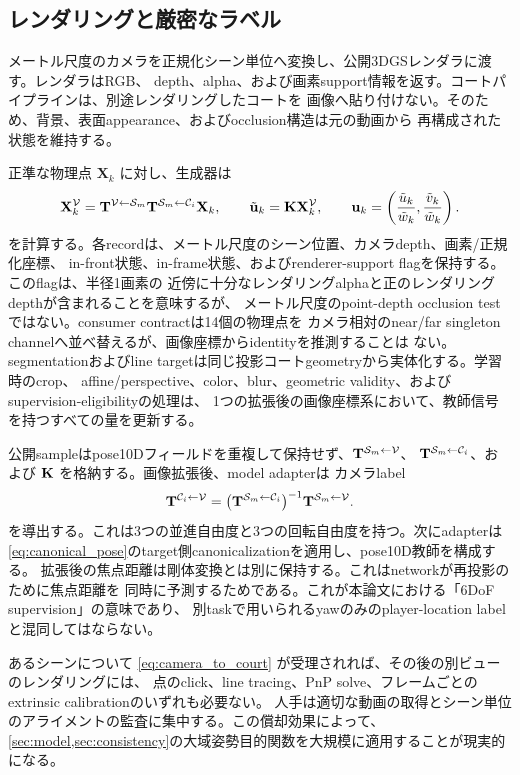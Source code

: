 

\subsection{レンダリングと厳密なラベル}
\label{sec:labels}

メートル尺度のカメラを正規化シーン単位へ変換し、公開3DGSレンダラに渡す。レンダラはRGB、
depth、alpha、および画素support情報を返す。コートパイプラインは、別途レンダリングしたコートを
画像へ貼り付けない。そのため、背景、表面appearance、およびocclusion構造は元の動画から
再構成された状態を維持する。

正準な物理点 \(\mathbf{X}_k\) に対し、生成器は
\begin{equation}
  \mathbf{X}^{\mathcal{V}}_k =
  \mathbf{T}^{\mathcal{V}\leftarrow \mathcal{S}_m}\mathbf{T}^{\mathcal{S}_m\leftarrow \mathcal{C}_i}\mathbf{X}_k,
  \qquad
  \tilde{\mathbf{u}}_k=\mathbf{K}\mathbf{X}^{\mathcal{V}}_k,
  \qquad
  \mathbf{u}_k=\left(\frac{\tilde u_k}{\tilde w_k},
                       \frac{\tilde v_k}{\tilde w_k}\right).
  \label{eq:label_projection}
\end{equation}
を計算する。各recordは、メートル尺度のシーン位置、カメラdepth、画素/正規化座標、
in-front状態、in-frame状態、およびrenderer-support flagを保持する。このflagは、半径1画素の
近傍に十分なレンダリングalphaと正のレンダリングdepthが含まれることを意味するが、
メートル尺度のpoint-depth occlusion testではない。consumer contractは14個の物理点を
カメラ相対のnear/far singleton channelへ並べ替えるが、画像座標からidentityを推測することは
ない。segmentationおよびline targetは同じ投影コートgeometryから実体化する。学習時のcrop、
affine/perspective、color、blur、geometric validity、およびsupervision-eligibilityの処理は、
1つの拡張後の画像座標系において、教師信号を持つすべての量を更新する。

公開sampleはpose10Dフィールドを重複して保持せず、\(\mathbf{T}^{\mathcal{S}_m\leftarrow \mathcal{V}}\)、
\(\mathbf{T}^{\mathcal{S}_m\leftarrow \mathcal{C}_i}\)、および \(\mathbf{K}\) を格納する。画像拡張後、model adapterは
カメラlabel
\begin{equation}
  \mathbf{T}^{\mathcal{C}_i\leftarrow \mathcal{V}}=
  \bigl(\mathbf{T}^{\mathcal{S}_m\leftarrow \mathcal{C}_i}\bigr)^{-1}\mathbf{T}^{\mathcal{S}_m\leftarrow \mathcal{V}}.
  \label{eq:camera_to_court}
\end{equation}
を導出する。これは3つの並進自由度と3つの回転自由度を持つ。次にadapterは
\cref{eq:canonical_pose}のtarget側canonicalizationを適用し、pose10D教師を構成する。
拡張後の焦点距離は剛体変換とは別に保持する。これはnetworkが再投影のために焦点距離を
同時に予測するためである。これが本論文における「6DoF supervision」の意味であり、
別taskで用いられるyawのみのplayer-location labelと混同してはならない。

あるシーンについて \cref{eq:camera_to_court} が受理されれば、その後の別ビューのレンダリングには、
点のclick、line tracing、PnP solve、フレームごとのextrinsic calibrationのいずれも必要ない。
人手は適切な動画の取得とシーン単位のアライメントの監査に集中する。この償却効果によって、
\cref{sec:model,sec:consistency}の大域姿勢目的関数を大規模に適用することが現実的になる。

